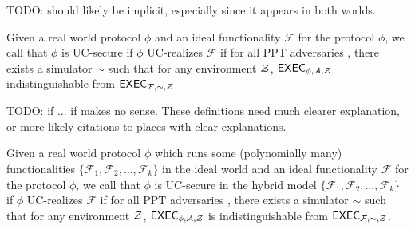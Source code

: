 TODO: \secparam should likely be implicit, especially since it appears in both worlds.

\begin{definition} \label{def:uc}
Given a real world protocol $ \phi $ and an ideal functionality $ \mathcal{F} $ for the protocol $ \phi $, we call that $ \phi $ is UC-secure if $ \phi $ UC-realizes $ \mathcal{F} $ if for all PPT adversaries \adv, there exists a simulator $ \sim  $ such that for any environment $ \mathcal{Z} $,
 $\mathsf{EXEC}_{\phi, \mathcal{A}, \mathcal{Z}}$ indistinguishable from $\mathsf{EXEC}_{\mathcal{F},\sim, \mathcal{Z}}$
\end{definition}

TODO: if ... if makes no sense.  These definitions need much clearer explanation, or more likely citations to places with clear explanations. 

\begin{definition}
Given a real world protocol $ \phi $ which runs some (polynomially many) functionalities $ \{\mathcal{F}_1, \mathcal{F}_2, \ldots, \mathcal{F}_k\} $ in the ideal world and an ideal functionality $ \mathcal{F} $ for the protocol $ \phi $, we call that $ \phi $ is UC-secure in the hybrid model $ \{\mathcal{F}_1, \mathcal{F}_2, \ldots, \mathcal{F}_k\} $ if $ \phi $ UC-realizes $ \mathcal{F} $ if for all PPT adversaries \adv, there exists a simulator $ \sim  $ such that for any environment $ \mathcal{Z} $,
 $\mathsf{EXEC}_{\phi, \mathcal{A}, \mathcal{Z}}$ is indistinguishable from $\mathsf{EXEC}_{\mathcal{F},\sim, \mathcal{Z}}$.
\end{definition}















\endinput



BROKEN BOLOW THIS




We fix $J \in \ecJ$ as a generator for public keys.  Any $\KeyGen$ algorithm randomly samples a secret keys $\sk \in \F_q$ and then computes its associate public keys $\pk = \sk J$.  We shall not discuss infrastructure that authorizes public keys.  Yet although our results do not require proof-of-knowledge on $\pk$ per se, we still strongly recommend that back certifications accompany any certificates that authorize $\pk$.

\smallskip




